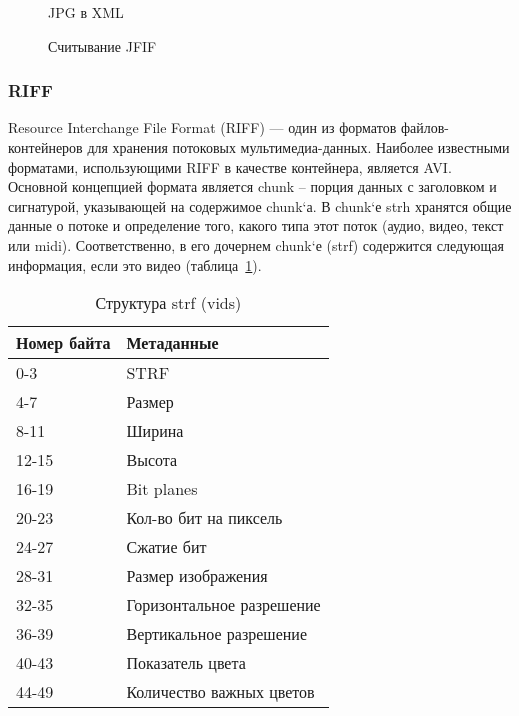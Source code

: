 \begin{figure}[h!]
\caption{JPG в XML}
\label{bokov_4:bokov_4}
\end{figure}

\begin{figure}[h!]
\caption{Считывание JFIF}
\label{bokov_3:bokov_3}
\end{figure} 

\clearpage

\subsubsection{RIFF}

Resource Interchange File Format (RIFF) --- один из форматов файлов-контейнеров для хранения потоковых мультимедиа-данных. Наиболее известными форматами, использующими RIFF в качестве контейнера, является AVI.
Основной концепцией формата является chunk -- порция данных с заголовком и сигнатурой, указывающей на содержимое chunk`а.
В chunk`е strh хранятся общие данные о потоке и определение того, какого типа этот поток (аудио, видео, текст или midi). Соответственно, в его дочернем chunk`е (strf) содержится следующая информация, если это видео (таблица~\ref{tab:strf}).

\begin{table}[ht]
\caption{Структура strf (vids)}
\label{tab:strf}
\begin{center}
\begin{tabularx}{\linewidth}{|l|X|}
\hline
Номер байта & Метаданные \\
\hline
0-3 & STRF \\
\hline
4-7 & Размер \\
\hline
8-11 & Ширина \\
\hline
12-15 & Высота \\
\hline
16-19 & Bit planes \\
\hline
20-23 & Кол-во бит на пиксель \\
\hline
24-27 & Сжатие бит \\
\hline
28-31 & Размер изображения \\
\hline
32-35 & Горизонтальное разрешение \\
\hline
36-39 & Вертикальное разрешение \\
\hline
40-43 & Показатель цвета \\
\hline
44-49 & Количество важных цветов \\
\hline
\end{tabularx}
\end{center}
\end{table}

